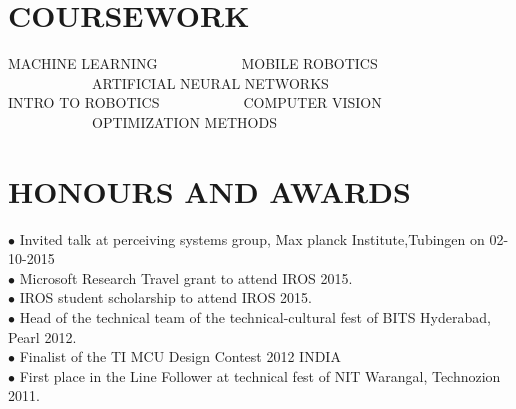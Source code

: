 \documentclass[a4paper,10pt]{article}
\begin{document}
\section{COURSEWORK}
MACHINE LEARNING\ \ \ \ \ \ \ \ \ \ \ \  MOBILE ROBOTICS \ \ \ \ \ \ \  \ \ \ \ \ ARTIFICIAL NEURAL NETWORKS \\  INTRO TO ROBOTICS\ \ \ \ \ \ \ \ \ \ \ \ COMPUTER VISION \ \ \ \  \ \ \ \ \ \ \ \   OPTIMIZATION METHODS\\



\section{HONOURS AND AWARDS}
$\bullet$  Invited talk at perceiving systems group, Max planck Institute,Tubingen on 02-10-2015\\
$\bullet$  Microsoft Research Travel grant to attend IROS 2015.\\
$\bullet$ IROS student scholarship to attend IROS 2015.\\
$\bullet$ Head of the technical team of the technical-cultural fest of BITS Hyderabad, Pearl 2012.\\
$\bullet$  Finalist of the TI MCU Design Contest 2012 INDIA \\
$\bullet$  First place in the Line Follower at technical fest of NIT Warangal, Technozion 2011.\\


\end{document}
